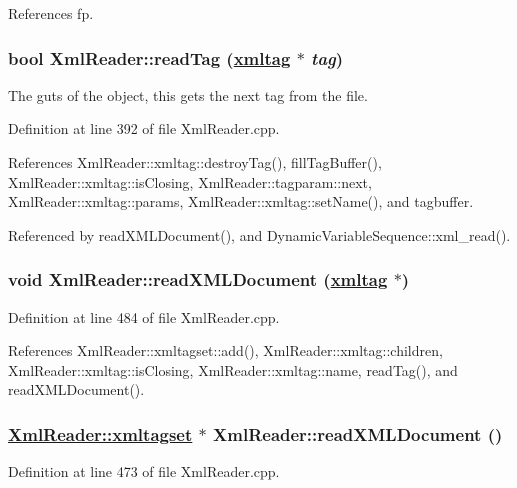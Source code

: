 References fp.\hypertarget{classXmlReader_a4}{
\subsubsection[readTag]{\setlength{\rightskip}{0pt plus 5cm}bool Xml\-Reader::read\-Tag (\hyperlink{classXmlReader_1_1xmltag}{xmltag} $\ast$ {\em tag})}}
\label{classXmlReader_a4}


The guts of the object, this gets the next tag from the file. 

Definition at line 392 of file Xml\-Reader.cpp.

References Xml\-Reader::xmltag::destroy\-Tag(), fill\-Tag\-Buffer(), Xml\-Reader::xmltag::is\-Closing, Xml\-Reader::tagparam::next, Xml\-Reader::xmltag::params, Xml\-Reader::xmltag::set\-Name(), and tagbuffer.

Referenced by read\-XMLDocument(), and Dynamic\-Variable\-Sequence::xml\_\-read().\hypertarget{classXmlReader_a6}{
\subsubsection[readXMLDocument]{\setlength{\rightskip}{0pt plus 5cm}void Xml\-Reader::read\-XMLDocument (\hyperlink{classXmlReader_1_1xmltag}{xmltag} $\ast$)}}
\label{classXmlReader_a6}




Definition at line 484 of file Xml\-Reader.cpp.

References Xml\-Reader::xmltagset::add(), Xml\-Reader::xmltag::children, Xml\-Reader::xmltag::is\-Closing, Xml\-Reader::xmltag::name, read\-Tag(), and read\-XMLDocument().\hypertarget{classXmlReader_a5}{
\subsubsection[readXMLDocument]{\setlength{\rightskip}{0pt plus 5cm}\hyperlink{classXmlReader_1_1xmltagset}{Xml\-Reader::xmltagset} $\ast$ Xml\-Reader::read\-XMLDocument ()}}
\label{classXmlReader_a5}




Definition at line 473 of file Xml\-Reader.cpp.

